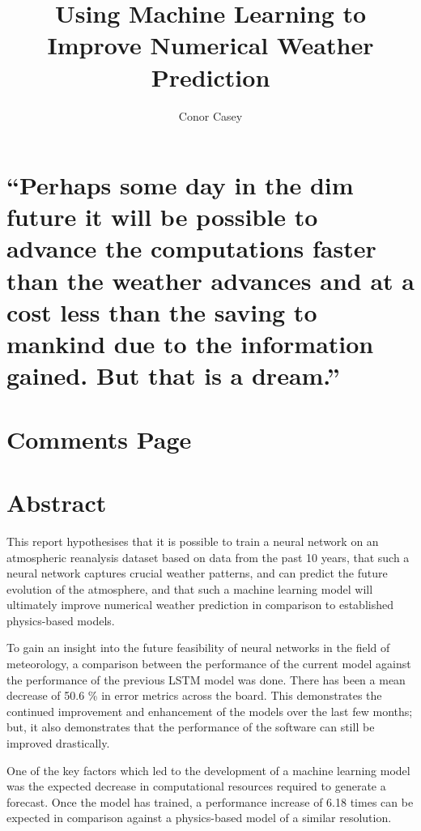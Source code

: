 \documentclass[hidelinks, 12pt]{style}
\title{Using Machine Learning to Improve Numerical Weather Prediction}
\author{Conor Casey}
\begin{document}
\maketitle

\clearpage\mbox{}\clearpage


\chapter*{
\centering
    ``Perhaps some day in the dim future it will be possible to advance the computations faster than the weather advances and at a cost less than the saving to mankind due to the information gained. But that is a dream.”
\\[5pt]
}

\chapter*{Comments Page}

\chapter*{Abstract}
This report hypothesises that it is possible to train a neural network on an atmospheric reanalysis dataset based on data from the past 10 years, that such a neural network captures crucial weather patterns, and can predict the future evolution of the atmosphere, and that such a machine learning model will ultimately improve numerical weather prediction in comparison to established physics-based models.

To gain an insight into the future feasibility of neural networks in the field of meteorology, a comparison between the performance of the current model against the performance of the previous LSTM model was done. There has been a mean decrease of 50.6 \% in error metrics across the board. This demonstrates the continued improvement and enhancement of the models over the last few months; but, it also demonstrates that the performance of the software can still be improved drastically. 

One of the key factors which led to the development of a machine learning model was the expected decrease in computational resources required to generate a forecast. Once the model has trained, a performance increase of 6.18 times can be expected in comparison against a physics-based model of a similar resolution.
\end{document}
